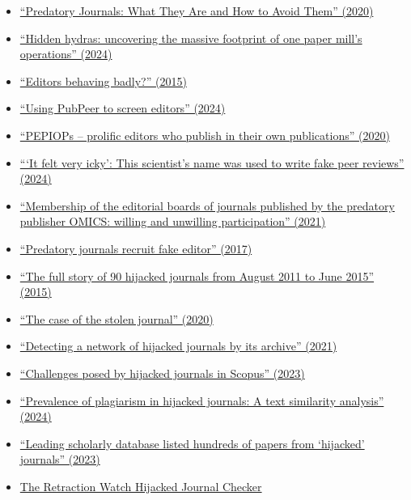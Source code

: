 \documentclass[letterpaper, 12pt]{article}
\begin{document}
\begin{itemize}
    \setlength\itemsep{-0.5em}
    \item \href{https://doi.org/10.1177/0192623320920209}{``Predatory Journals: What They Are and How to Avoid Them'' (2020)}
    \item \href{https://retractionwatch.com/2024/10/01/hidden-hydras-uncovering-the-massive-footprint-of-one-paper-mills-operations/}{``Hidden hydras: uncovering the massive footprint of one paper mill’s operations'' (2024)}
    \item \href{https://deevybee.blogspot.com/2015/02/editors-behaving-badly.html}{``Editors behaving badly?'' (2015)}
    \item \href{https://deevybee.blogspot.com/2024/09/using-pubpeer-to-screen-editors.html}{``Using PubPeer to screen editors'' (2024)}
    \item \href{https://deevybee.blogspot.com/2020/08/pepiops-prolific-editors-who-publish-in.html}{``PEPIOPs – prolific editors who publish in their own publications'' (2020)}
    \item \href{https://www.science.org/content/article/it-felt-very-icky-scientist-s-name-was-used-write-fake-peer-reviews}{```It felt very icky': This scientist's name was used to write fake peer reviews'' (2024)}
    \item \href{https://doi.org/10.47989/irpaper912}{``Membership of the editorial boards of journals published by the predatory publisher OMICS: willing and unwilling participation'' (2021)}
    \item \href{https://doi.org/10.1038/543481a}{``Predatory journals recruit fake editor'' (2017)}
    \item \href{https://doi.org/10.18421/GP19.02-06}{``The full story of 90 hijacked journals from August 2011 to June 2015'' (2015)}
    \item \href{https://retractionwatch.com/2020/07/07/the-case-of-the-stolen-journal/}{``The case of the stolen journal'' (2020)}
    \item \href{https://doi.org/10.1007/s11192-021-04056-0}{``Detecting a network of hijacked journals by its archive'' (2021)}
    \item \href{https://doi.org/10.1002/asi.24855}{``Challenges posed by hijacked journals in Scopus'' (2023)}
    \item \href{https://doi.org/10.1080/08989621.2024.2387210}{``Prevalence of plagiarism in hijacked journals: A text similarity analysis'' (2024)}
    \item \href{https://doi.org/10.1126/science.zcgp0a2}{``Leading scholarly database listed hundreds of papers from ‘hijacked’ journals'' (2023)}
    \item \href{https://retractionwatch.com/the-retraction-watch-hijacked-journal-checker/}{The Retraction Watch Hijacked Journal Checker}
\end{itemize}
\end{document}
